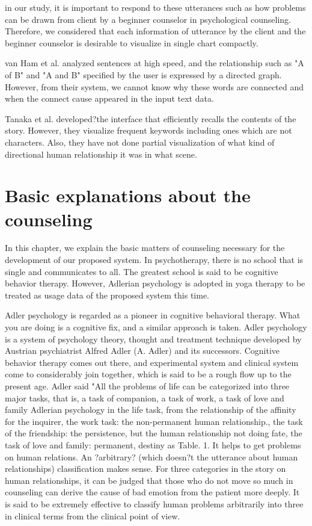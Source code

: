 \documentclass[review]{elsarticle}
\begin{document}
  in our study, it is important to respond to these utterances such as how problems can be drawn from client by a beginner counselor in psychological counseling. Therefore, we considered that each information of utterance by the client and the beginner counselor is desirable to visualize in single chart compactly.

  van Ham \cite{van2009mapping} et al. analyzed sentences at high speed, and the relationship such as "A of B" and "A and B" specified by the user is expressed by a directed graph. However, from their system, we cannot know why these words are connected and when the connect cause appeared in the input text data.

  Tanaka et al. \cite{tanaka} developed?the interface that efficiently recalls the contents of the story. However, they visualize frequent keywords including ones which are not characters. Also, they have not done partial visualization of what kind of directional human relationship it was in what scene. 

\section{Basic explanations about the counseling}

  In this chapter, we explain the basic matters of counseling necessary for the development of our proposed system. In psychotherapy, there is no school that is single and communicates to all. The greatest school is said to be cognitive behavior therapy. However, Adlerian psychology is adopted in yoga therapy to be treated as usage data of the proposed system this time.

Adler psychology is regarded as a pioneer in cognitive behavioral therapy. What you are doing is a cognitive fix, and a similar approach is taken. Adler psychology is a system of psychology theory, thought and treatment technique developed by Austrian psychiatrist Alfred Adler (A. Adler) and its successors\cite{grad2002preamble}.  Cognitive behavior therapy comes out there, and experimental system and clinical system come to considerably join together, which is said to be a rough flow up to the present age. Adler said "All the problems of life can be categorized into three major tasks, that is, a task of companion, a task of work, a task of love and family \cite{ad2} Adlerian psychology in the life task, from the relationship of the affinity for the inquirer, the work task: the non-permanent human relationship., the task of the friendship: the persistence, but the human relationship not doing fate, the task of love and family: permanent, destiny as Table. 1. It helps to get problems on human relations. An ?arbitrary? (which doesn?t the utterance about human relationships) classification makes sense. For three categories in the story on human relationships, it can be judged that those who do not move so much in counseling can derive the cause of bad emotion from the patient more deeply. It is said to be extremely effective to classify human problems arbitrarily into three in clinical terms from the clinical point of view. 
\end{document}
